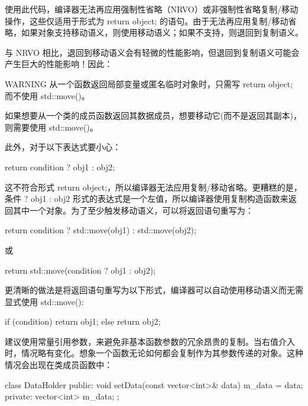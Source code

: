使用此代码，编译器无法再应用强制性省略（NRVO）或非强制性省略复制/移动操作，这些仅适用于形式为 return object; 的语句。由于无法再应用复制/移动省略，如果对象支持移动语义，则使用移动语义；如果不支持，则退回到复制语义。

与 NRVO 相比，退回到移动语义会有轻微的性能影响，但退回到复制语义可能会产生巨大的性能影响！因此：

\begin{myWarning}{WARNING}
从一个函数返回局部变量或匿名临时对象时，只需写 return object; 而不使用 std::move()。
\end{myWarning}

如果想要从一个类的成员函数返回其数据成员，想要移动它(而不是返回其副本)，则需要使用 std::move()。

此外，对于以下表达式要小心：

\begin{cpp}
return condition ? obj1 : obj2;
\end{cpp}

这不符合形式 return object;，所以编译器无法应用复制/移动省略。更糟糕的是，条件 ? obj1 : obj2 形式的表达式是一个左值，所以编译器使用复制构造函数来返回其中一个对象。为了至少触发移动语义，可以将返回语句重写为：

\begin{cpp}
return condition ? std::move(obj1) : std::move(obj2);
\end{cpp}

或

\begin{cpp}
return std::move(condition ? obj1 : obj2);
\end{cpp}

更清晰的做法是将返回语句重写为以下形式，编译器可以自动使用移动语义而无需显式使用 std::move():

\begin{cpp}
if (condition) {
    return obj1;
} else {
    return obj2;
}
\end{cpp}


建议使用常量引用参数，来避免非基本函数参数的冗余昂贵的复制。当右值介入时，情况略有变化。想象一个函数无论如何都会复制作为其参数传递的对象。这种情况会出现在类成员函数中：

\begin{cpp}
class DataHolder
{
    public:
        void setData(const vector<int>& data) { m_data = data; }
    private:
        vector<int> m_data;
};
\end{cpp}


